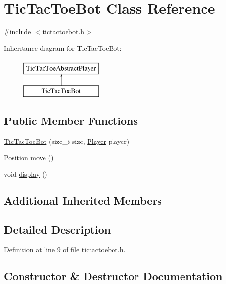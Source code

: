 \hypertarget{class_tic_tac_toe_bot}{}\section{Tic\+Tac\+Toe\+Bot Class Reference}
\label{class_tic_tac_toe_bot}


{\ttfamily \#include $<$tictactoebot.\+h$>$}

Inheritance diagram for Tic\+Tac\+Toe\+Bot\+:\begin{figure}[H]
\begin{center}
\leavevmode
\includegraphics[height=2.000000cm]{class_tic_tac_toe_bot}
\end{center}
\end{figure}
\subsection*{Public Member Functions}
\begin{DoxyCompactItemize}
\item 
\hyperlink{class_tic_tac_toe_bot_acad176967b40f0b38444cc56e90b07c3}{Tic\+Tac\+Toe\+Bot} (size\+\_\+t size, \hyperlink{common__defs_8h_a9c8780378078e51e7c9041cbac392db9}{Player} player)
\item 
\hyperlink{common__defs_8h_af9623b96ea87eb8f2d0fe97e45b0f79a}{Position} \hyperlink{class_tic_tac_toe_bot_a66939785d51528036aab9cc37dd5fad5}{move} ()
\item 
void \hyperlink{class_tic_tac_toe_bot_a2af7f24506849f05ed37e9750b515c3d}{display} ()
\end{DoxyCompactItemize}
\subsection*{Additional Inherited Members}


\subsection{Detailed Description}


Definition at line 9 of file tictactoebot.\+h.



\subsection{Constructor \& Destructor Documentation}
\mbox{\label{class_tic_tac_toe_bot_acad176967b40f0b38444cc56e90b07c3}} 

